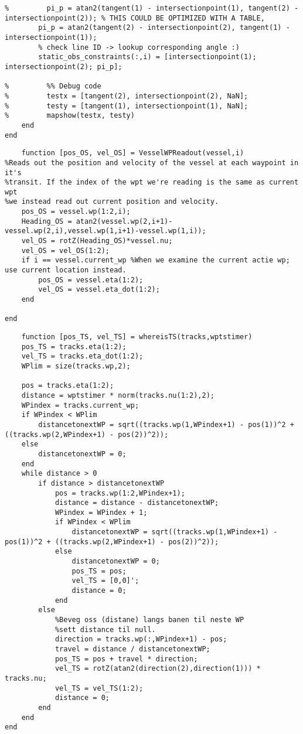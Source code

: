 \begin{lstlisting}
%         pi_p = atan2(tangent(1) - intersectionpoint(1), tangent(2) - intersectionpoint(2)); % THIS COULD BE OPTIMIZED WITH A TABLE, 
        pi_p = atan2(tangent(2) - intersectionpoint(2), tangent(1) - intersectionpoint(1));
        % check line ID -> lookup corresponding angle :)
        static_obs_constraints(:,i) = [intersectionpoint(1); intersectionpoint(2); pi_p];
        
%         %% Debug code
%         testx = [tangent(2), intersectionpoint(2), NaN];
%         testy = [tangent(1), intersectionpoint(1), NaN];
%         mapshow(testx, testy)
    end
end
\end{lstlisting}

\clearpage
\begin{lstlisting}
    function [pos_OS, vel_OS] = VesselWPReadout(vessel,i)
%Reads out the position and velocity of the vessel at each waypoint in it's
%transit. If the index of the wpt we're reading is the same as current wpt
%we instead read out current position and velocity.
    pos_OS = vessel.wp(1:2,i);
    Heading_OS = atan2(vessel.wp(2,i+1)-vessel.wp(2,i),vessel.wp(1,i+1)-vessel.wp(1,i));
    vel_OS = rotZ(Heading_OS)*vessel.nu;
    vel_OS = vel_OS(1:2);
    if i == vessel.current_wp %When we examine the current actie wp; use current location instead.
        pos_OS = vessel.eta(1:2);
        vel_OS = vessel.eta_dot(1:2);
    end
    
end
\end{lstlisting}

\clearpage
\begin{lstlisting}
    function [pos_TS, vel_TS] = whereisTS(tracks,wptstimer)
    pos_TS = tracks.eta(1:2);
    vel_TS = tracks.eta_dot(1:2);
    WPlim = size(tracks.wp,2);

    pos = tracks.eta(1:2);
    distance = wptstimer * norm(tracks.nu(1:2),2);
    WPindex = tracks.current_wp;
    if WPindex < WPlim
        distancetonextWP = sqrt((tracks.wp(1,WPindex+1) - pos(1))^2 + ((tracks.wp(2,WPindex+1) - pos(2))^2));
    else
        distancetonextWP = 0;
    end
    while distance > 0
        if distance > distancetonextWP
            pos = tracks.wp(1:2,WPindex+1);
            distance = distance - distancetonextWP;
            WPindex = WPindex + 1;
            if WPindex < WPlim
                distancetonextWP = sqrt((tracks.wp(1,WPindex+1) - pos(1))^2 + ((tracks.wp(2,WPindex+1) - pos(2))^2));
            else
                distancetonextWP = 0;
                pos_TS = pos;
                vel_TS = [0,0]';
                distance = 0;
            end
        else
            %Beveg oss (distane) langs banen til neste WP
            %sett distance til null.
            direction = tracks.wp(:,WPindex+1) - pos;
            travel = distance / distancetonextWP;
            pos_TS = pos + travel * direction;
            vel_TS = rotZ(atan2(direction(2),direction(1))) * tracks.nu;
            vel_TS = vel_TS(1:2);
            distance = 0;
        end
    end
end




\end{lstlisting}